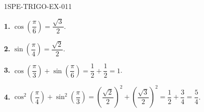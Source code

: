\begin{corrige}{1SPE-TRIGO-EX-011}

\textbf{1.} $\cos\!\left(\dfrac{\pi}{6}\right) = \dfrac{\sqrt{3}}{2}$.

\textbf{2.} $\sin\!\left(\dfrac{\pi}{4}\right) = \dfrac{\sqrt{2}}{2}$.

\textbf{3.} $\cos\!\left(\dfrac{\pi}{3}\right) + \sin\!\left(\dfrac{\pi}{6}\right) = \dfrac{1}{2} + \dfrac{1}{2} = 1$.

\textbf{4.} $\cos^2\!\left(\dfrac{\pi}{4}\right) + \sin^2\!\left(\dfrac{\pi}{3}\right) = \left(\dfrac{\sqrt{2}}{2}\right)^2 + \left(\dfrac{\sqrt{3}}{2}\right)^2 = \dfrac{1}{2} + \dfrac{3}{4} = \dfrac{5}{4}$.

\end{corrige}
